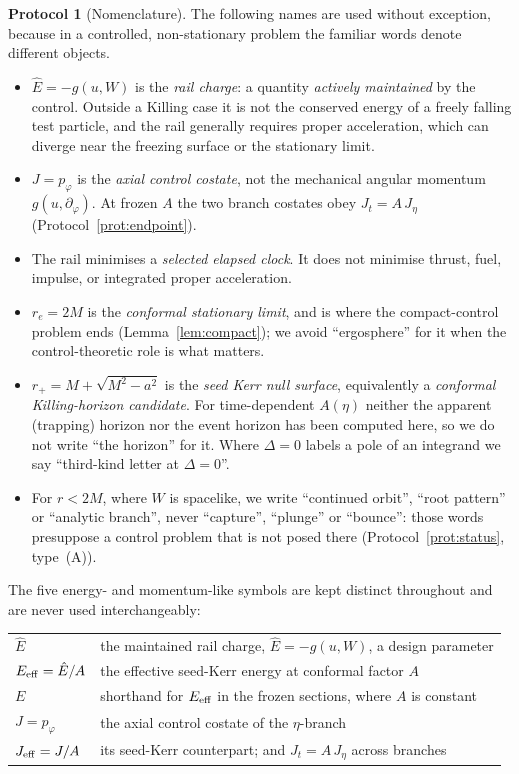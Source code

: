 \documentclass[12pt]{iopart}
\theoremstyle{plain}
\theoremstyle{definition}
\newtheorem{protocol}{Protocol}
\theoremstyle{remark}
\newcommand{\Ehat}{\hat E}
\newcommand{\rp}{r_{+}}
\newcommand{\re}{r_{e}}
\begin{document}
\begin{protocol}[Nomenclature]
\label{prot:names}
The following names are used without exception, because in a controlled,
non-stationary problem the familiar words denote different objects.
\begin{itemize}
\item $\Ehat=-g(u,W)$ is the \emph{rail charge}: a quantity \emph{actively
maintained} by the control. Outside a Killing case it is not the conserved
energy of a freely falling test particle, and the rail generally requires proper
acceleration, which can diverge near the freezing surface or the stationary
limit.
\item $J=p_\varphi$ is the \emph{axial control costate}, not the mechanical
angular momentum $g(u,\partial_\varphi)$. At frozen $A$ the two branch costates
obey $J_t=A\,J_\eta$ (Protocol~\ref{prot:endpoint}).
\item The rail minimises a \emph{selected elapsed clock}. It does not minimise
thrust, fuel, impulse, or integrated proper acceleration.
\item $\re=2M$ is the \emph{conformal stationary limit}, and is where the
compact-control problem ends (Lemma~\ref{lem:compact}); we avoid ``ergosphere''
for it when the control-theoretic role is what matters.
\item $\rp=M+\sqrt{M^2-a^2}$ is the \emph{seed Kerr null surface}, equivalently a
\emph{conformal Killing-horizon candidate}. For time-dependent $A(\eta)$ neither
the apparent (trapping) horizon nor the event horizon has been computed here, so
we do not write ``the horizon'' for it. Where $\Delta=0$ labels a pole of an
integrand we say ``third-kind letter at $\Delta=0$''.
\item For $r<2M$, where $W$ is spacelike, we write ``continued orbit'', ``root
pattern'' or ``analytic branch'', never ``capture'', ``plunge'' or ``bounce'':
those words presuppose a control problem that is not posed there
(Protocol~\ref{prot:status}, type~(A)).
\end{itemize}
The five energy- and momentum-like symbols are kept distinct throughout and are
never used interchangeably:
\begin{center}
\begin{tabular}{@{}ll@{}}
\hline
$\Ehat$ & the maintained rail charge, $\Ehat=-g(u,W)$, a design parameter\\
$E_{\rm eff}=\Ehat/A$ & the effective seed-Kerr energy at conformal factor $A$\\
$E$ & shorthand for $E_{\rm eff}$ in the frozen sections, where $A$ is constant\\
$J=p_\varphi$ & the axial control costate of the $\eta$-branch\\
$J_{\rm eff}=J/A$ & its seed-Kerr counterpart; and $J_t=A\,J_\eta$ across branches\\
\hline
\end{tabular}
\end{center}


\end{protocol}
\end{document}

